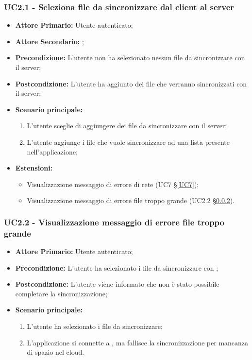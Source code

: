 \subsubsection{UC2.1 - Seleziona file da sincronizzare dal client al server}
\begin{itemize}
\item \textbf{Attore Primario:} Utente autenticato;
\item \textbf{Attore Secondario:} ;
\item \textbf{Precondizione:} L'utente non ha selezionato nessun file da sincronizzare con il server;
\item \textbf{Postcondizione:} L'utente ha aggiunto dei file che verranno sincronizzati con il server;
\item \textbf{Scenario principale:}
    \begin{enumerate}
    \item L'utente sceglie di aggiungere dei file da sincronizzare con il server;
    \item L'utente aggiunge i file che vuole sincronizzare ad una lista presente nell'applicazione;
    \end{enumerate}
\item \textbf{Estensioni:}
    \begin{itemize}
    \item Visualizzazione messaggio di errore di rete (UC7 \S{}\ref{UC7});
    \item Visualizzazione messaggio di errore file troppo grande (UC2.2 \S{}\ref{UC2.2}).
    \end{itemize}
\end{itemize}
\subsubsection{UC2.2 - Visualizzazione messaggio di errore file troppo grande}
\label{UC2.2}
\begin{itemize}
\item \textbf{Attore Primario:} Utente autenticato;
\item \textbf{Precondizione:} L'utente ha selezionato i file da sincronizzare con ;
\item \textbf{Postcondizione:} L'utente viene informato che non è stato possibile completare la sincronizzazione;
\item \textbf{Scenario principale:}
    \begin{enumerate}
    \item L'utente ha selezionato i file da sincronizzare;
    \item L'applicazione si connette a , ma fallisce la sincronizzazione per mancanza di spazio nel cloud.
    \end{enumerate}
\end{itemize}